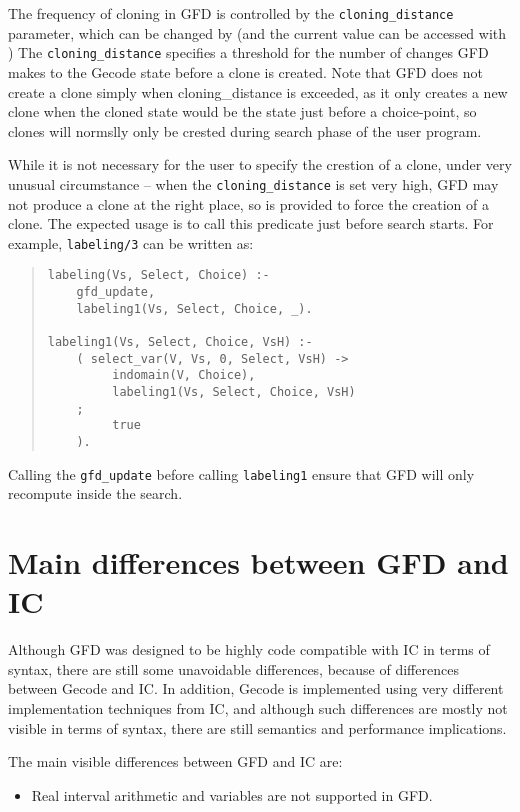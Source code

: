 \begin{description}
The frequency of cloning in GFD is controlled by the
\texttt{cloning_distance} parameter, which can be changed by
(and the current value can be accessed with
)
The \texttt{cloning_distance} specifies a threshold for the number of
changes GFD makes to the Gecode state before a clone is created.
Note that GFD does not create a clone simply when cloning_distance is
exceeded, as it only creates a new clone when the cloned state would
be the state just before a choice-point, so clones will normslly only
be crested during search phase of the user program.

While it is not necessary for the user to specify the crestion of a clone,
under very unusual circumstance -- when the \texttt{cloning_distance} is
set very high, GFD may not produce a clone at the right place, so 
 is provided to force the creation of a clone.
The expected usage is to call this predicate just before search starts.
For example, \texttt{labeling/3} can be written as:

\begin{quote}
\begin{verbatim}
labeling(Vs, Select, Choice) :-
    gfd_update,
    labeling1(Vs, Select, Choice, _).

labeling1(Vs, Select, Choice, VsH) :-
    ( select_var(V, Vs, 0, Select, VsH) ->
         indomain(V, Choice),
         labeling1(Vs, Select, Choice, VsH)
    ;
         true
    ).

\end{verbatim}
\end{quote}
Calling the \texttt{gfd_update} before calling \texttt{labeling1} ensure that
GFD will only recompute inside the search.

\section{Main differences between GFD and IC}

Although GFD was designed to be highly code compatible with IC in terms of
syntax, there are still some unavoidable differences, because of differences 
between Gecode and IC. In addition, Gecode is 
implemented using very different implementation techniques from IC, and 
although such differences are mostly not visible in terms of syntax, there
are still semantics and performance implications. 

The main visible differences between GFD and IC are:
\begin{itemize}
       \item Real interval arithmetic and variables are not supported in GFD.


\end{itemize}
\end{description}
